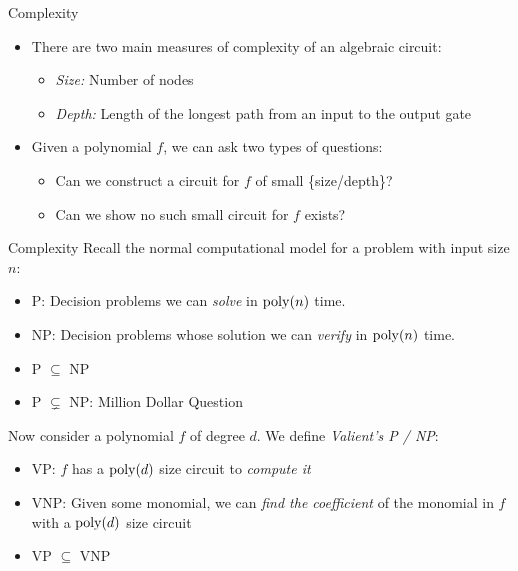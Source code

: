 \documentclass[aspectratio=169]{beamer}
\begin{document}
\begin{frame}{Complexity}
    \begin{itemize}
        \item There are two main measures of complexity of an algebraic circuit: \pause
        \begin{itemize} 
            \item \emph{Size:} Number of nodes \pause
            \item \emph{Depth:} Length of the longest path from an input to the output gate \pause
        \end{itemize}
        \item Given a polynomial $f$, we can ask two types of questions: \pause
        \begin{itemize}
            \item Can we construct a circuit for $f$ of small \{size/depth\}? \pause
            \item Can we show no such small circuit for $f$ exists?
        \end{itemize}
    \end{itemize}
\end{frame}

\begin{frame}{Complexity}
    Recall the normal computational model for a problem with input size $n$:
    \begin{itemize}
        \item P: Decision problems we can \emph{solve} in $\operatorname{poly}(n)$ time.
        \item NP: Decision problems whose solution we can \emph{verify} in $\operatorname{poly}(n)$ time.
        \item P $\subseteq$ NP
        \item \textcolor{sigma@alertred}{P $\subsetneq$ NP}: Million Dollar Question
    \end{itemize} \pause
    Now consider a polynomial $f$ of degree $d$. We define \emph{Valient's P / NP}: \pause
    \begin{itemize}
        \item VP: $f$ has a $\operatorname{poly}(d)$ size circuit to \emph{compute it}\pause
        \item VNP: Given some monomial, we can \emph{find the coefficient} of the monomial in $f$ with a $\operatorname{poly}(d)$ size circuit \pause
        \item VP $\subseteq$ VNP
    \end{itemize}
\end{frame}
\end{document}
